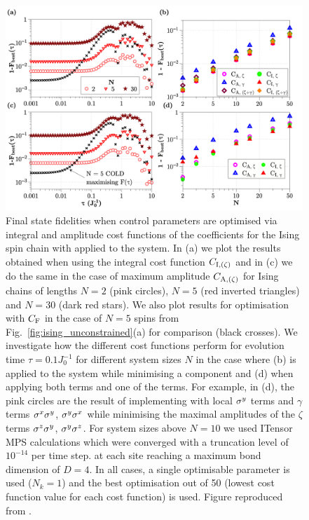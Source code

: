 \begin{figure}[t!]
    \centering
    \includegraphics[width=\linewidth]{images_v1/ising_max_int_plots.png} \caption[Plot of final state fidelity for the Ising spin chain for different cost functions with LCD applied.]{Final state fidelities when control parameters are optimised via integral and amplitude cost functions of the   coefficients for the Ising spin chain with   applied to the system. In (a) we plot the results obtained when using the integral cost function $C_{\rm I, (\zeta)}$ and in (c) we do the same in the case of maximum amplitude $C_{\rm A, (\zeta)}$ for Ising chains of lengths $N = 2$ (pink circles), $N = 5$ (red inverted triangles) and $N=30$ (dark red stars). We also plot results for  optimisation with $C_{\rm F}$ in the case of $N=5$ spins from Fig.~\ref{fig:ising_unconstrained}(a) for comparison (black crosses). We investigate how the different cost functions perform for evolution time $\tau = 0.1J_0^{-1}$ for different system sizes $N$ in the case where (b)   is applied to the system while minimising a  component and (d) when applying both  terms and one of the  terms. For example, in (d), the pink circles are the result of implementing  with  local $\sigma^y$ terms and $\gamma$ terms $\sigma^x\sigma^y$, $\sigma^y\sigma^x$ while minimising the maximal amplitudes of the $\zeta$ terms $\sigma^z\sigma^y$, $\sigma^y\sigma^z$. For system sizes above $N=10$ we used ITensor\cite{fishman_itensor_2022} MPS calculations which were converged with a truncation level of $10^{-14}$ per time step. at each site reaching a maximum bond dimension of $D = 4$. In all cases, a single optimisable parameter is used ($N_k = 1$) and the best optimisation out of 50 (lowest cost function value for each cost function) is used. Figure reproduced from \cite{cepaite_cold_2023}.}\label{fig:ising_minimising_ho_mainplot}
\end{figure}


